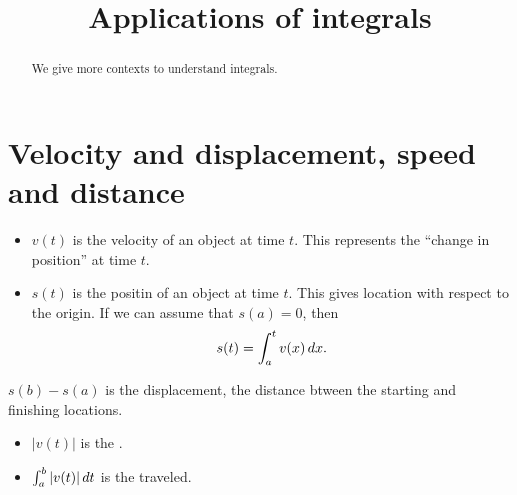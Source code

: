 \documentclass{ximera}
\title[Dig-In:]{Applications of integrals}
\begin{document}
\begin{abstract}
We give more contexts to understand integrals.
\end{abstract}
\maketitle



\section{Velocity and displacement, speed and distance}

\begin{definition}
  \begin{itemize}
  \item $v(t)$ is the velocity of an object at time $t$. This
    represents the ``change in position'' at time $t$.
  \item $s(t)$ is the positin of an object at time $t$. This gives
    location with respect to the origin. If we can assume that $s(a)
    = 0$, then
    \[
    s(t) = \int_a^t v(x) \,d x.
    \]
  \end{itemize}
\item $s(b) -s(a)$ is the displacement, the distance btween the
  starting and finishing locations.
\end{definition}

\begin{definition}
  \begin{itemize}
  \item $|v(t)|$ is the .
  \item $\int_a^b |v(t)| \,d t$ is the  traveled.
  \end{itemize}
\end{definition}
\end{document}
